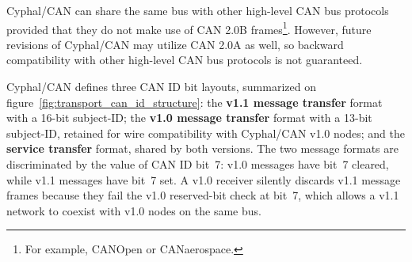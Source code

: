 Cyphal/CAN can share the same bus with other high-level CAN bus protocols provided that they
do not make use of CAN 2.0B frames\footnote{For example, CANOpen or CANaerospace.}.
However, future revisions of Cyphal/CAN may utilize CAN 2.0A as well,
so backward compatibility with other high-level CAN bus protocols is not guaranteed.

Cyphal/CAN defines three CAN ID bit layouts, summarized on figure~\ref{fig:transport_can_id_structure}:
the \textbf{v1.1 message transfer} format with a 16-bit subject-ID;
the \textbf{v1.0 message transfer} format with a 13-bit subject-ID, retained for wire compatibility with
Cyphal/CAN v1.0 nodes; and the \textbf{service transfer} format, shared by both versions.
The two message formats are discriminated by the value of CAN ID bit~7:
v1.0 messages have bit~7 cleared, while v1.1 messages have bit~7 set.
A v1.0 receiver silently discards v1.1 message frames because they fail the v1.0 reserved-bit check at bit~7,
which allows a v1.1 network to coexist with v1.0 nodes on the same bus.

